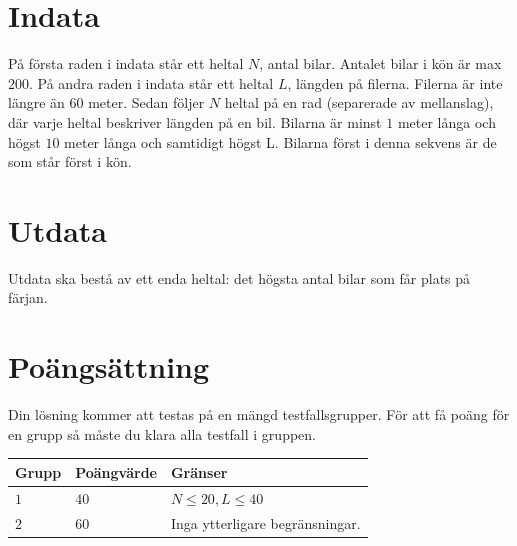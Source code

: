 \section*{Indata}
På första raden i indata står ett heltal $N$, antal bilar. Antalet bilar i kön är max $200$. På andra raden i indata står ett heltal $L$, längden på filerna. Filerna är inte längre än $60$ meter. Sedan följer $N$ heltal på en rad (separerade av mellanslag), där varje heltal beskriver längden på en bil. Bilarna är minst $1$ meter långa och högst $10$ meter långa och samtidigt högst L. Bilarna först i denna sekvens är de som står först i kön.

\section*{Utdata}
Utdata ska bestå av ett enda heltal: det högsta antal bilar som får plats på färjan.

\section*{Poängsättning}
Din lösning kommer att testas på en mängd testfallsgrupper.
För att få poäng för en grupp så måste du klara alla testfall i gruppen.

\noindent
\begin{tabular}{| l | l | p{12cm} |}
  \hline
  Grupp & Poängvärde & Gränser \\ \hline
  $1$    & $40$        & $N \le 20, L \le 40$ \\ \hline 
  $2$    & $60$        & Inga ytterligare begränsningar. \\ \hline 
\end{tabular}

